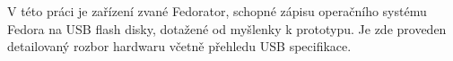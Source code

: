 V této práci je zařízení zvané Fedorator, schopné zápisu operačního systému Fedora na USB flash disky, dotažené od myšlenky k prototypu.  Je zde proveden detailovaný rozbor hardwaru včetně přehledu USB specifikace.
